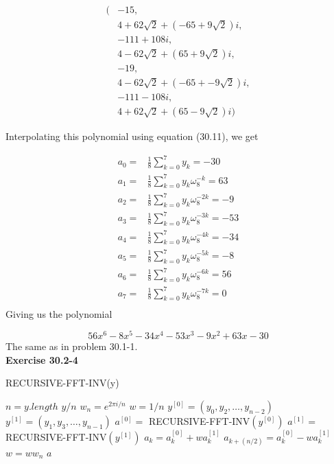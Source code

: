 \documentclass{article}
\begin{document}
 \begin{align*}
  (&-15,\\
  &4+62\sqrt{2}+ (-65+9\sqrt{2})i,\\
  &-111 + 108i,\\
  & 4-62\sqrt{2}+ (65+9\sqrt{2})i,\\
  & -19,\\
  &4-62\sqrt{2}+ (-65+-9\sqrt{2})i,\\
  &-111-108i,\\
  &4+62\sqrt{2}+ (65-9\sqrt{2})i)
  \end{align*}
  
    Interpolating this polynomial using equation (30.11), we get

\begin{align*}
a_0 =& \frac{1}{8} \sum_{k=0}^{7} y_k = -30\\
a_1 =& \frac{1}{8} \sum_{k=0}^{7} y_k \omega_8^{-k} = 63\\
a_2 =& \frac{1}{8} \sum_{k=0}^{7} y_k \omega_8^{-2k} = -9\\
a_3 =& \frac{1}{8} \sum_{k=0}^{7} y_k \omega_8^{-3k} = -53\\
a_4 =& \frac{1}{8} \sum_{k=0}^{7} y_k \omega_8^{-4k} = -34\\
a_5 =& \frac{1}{8} \sum_{k=0}^{7} y_k \omega_8^{-5k} = -8\\
a_6 =& \frac{1}{8} \sum_{k=0}^{7} y_k \omega_8^{-6k} = 56\\
a_7 =& \frac{1}{8} \sum_{k=0}^{7} y_k \omega_8^{-7k} = 0\\
\end{align*}
Giving us the polynomial

\[
56x^6 -8x^5-34x^4-53x^3-9x^2+63x-30
\]
The same as in problem 30.1-1.\\

\noindent\textbf{Exercise 30.2-4}\\

\begin{algorithm}
\caption{RECURSIVE-FFT-INV(y)}
\begin{algorithmic}[1]
\State $n = y.length$
	\State \Return $y/n$
\EndIf
\State $w_n = e^{2\pi i/n}$
\State $w = 1/n$
\State $y^{[0]} = (y_0,y_2,\ldots,y_{n-2})$
\State $y^{[1]} = (y_1,y_3,\ldots,y_{n-1})$
\State $a^{[0]} = $ RECURSIVE-FFT-INV$(y^{[0]})$
\State $a^{[1]} = $ RECURSIVE-FFT-INV$(y^{[1]})$
	\State $a_k = a_k^{[0]} + wa_k^{[1]}$
	\State $a_{k+(n/2)} = a_k^{[0]} - wa_k^{[1]}$
	\State $w = w w_n$
\EndFor
\State \Return $a$
\end{algorithmic}
\end{algorithm}
\end{document}
